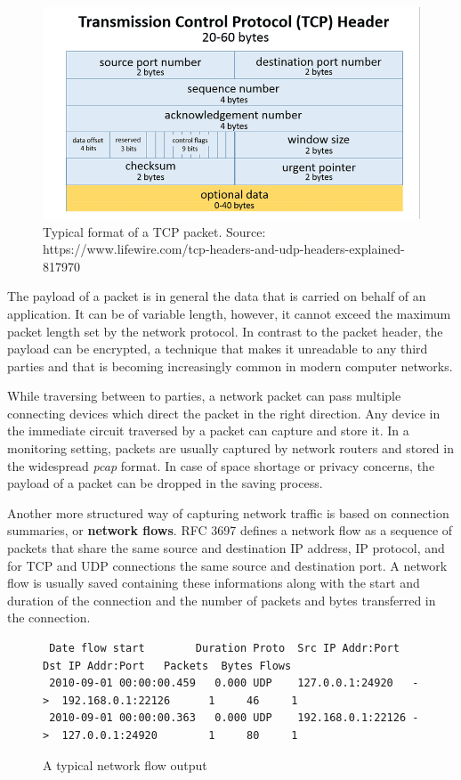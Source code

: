 \documentclass[a4paper,12pt,twoside]{report}
\begin{document}
\begin{figure}[h!]
\centering
\includegraphics[scale=0.4]{tcp_header.png}
\caption{Typical format of a TCP packet. Source:\scriptsize{ https://www.lifewire.com/tcp-headers-and-udp-headers-explained-817970}\normalsize}
\end{figure}


The payload of a packet is in general the data that is carried on behalf of an application. It can be of variable length, however, it cannot exceed the maximum packet length set by the network protocol. In contrast to the packet header, the payload can be encrypted, a technique that makes it unreadable to any third parties and that is becoming increasingly common in modern computer networks. 


While traversing between to parties, a network packet can pass multiple connecting devices which direct the packet in the right direction. Any device in the immediate circuit traversed by a packet can capture and store it. In a monitoring setting, packets are usually captured by network routers and stored in the widespread \textit{pcap} format. In case of space shortage or privacy concerns, the payload of a packet can be dropped in the saving process.


Another more structured way of capturing network traffic is based on connection summaries, or \textbf{network flows}. RFC 3697 \cite{brownlee1999traffic} defines a network flow as a sequence of packets that share the same source and destination IP address, IP protocol, and for TCP and UDP connections the same source and destination port. A network flow is usually saved containing these informations along with the start and duration of the connection and the number of packets and bytes transferred in the connection.


\begin{figure}[h!]
\scriptsize
\centering
\begin{verbatim}
 Date flow start        Duration Proto  Src IP Addr:Port      Dst IP Addr:Port   Packets  Bytes Flows
 2010-09-01 00:00:00.459   0.000 UDP    127.0.0.1:24920   ->  192.168.0.1:22126      1     46     1
 2010-09-01 00:00:00.363   0.000 UDP    192.168.0.1:22126 ->  127.0.0.1:24920        1     80     1
\end{verbatim}
\normalsize
\caption{A typical network flow output}
\end{figure}
\end{document}
